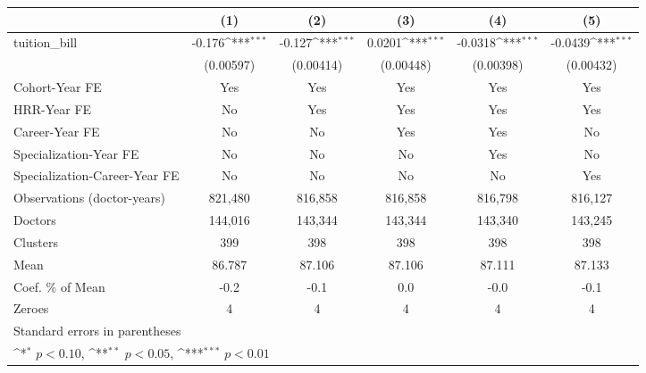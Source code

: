 {
\def\sym#1{\ifmmode^{#1}\else\(^{#1}\)\fi}
\begin{tabular}{l*{5}{c}}
\hline\hline
                    &\multicolumn{1}{c}{(1)}         &\multicolumn{1}{c}{(2)}         &\multicolumn{1}{c}{(3)}         &\multicolumn{1}{c}{(4)}         &\multicolumn{1}{c}{(5)}         \\
\hline
tuition\_bill        &      -0.176\sym{***}&      -0.127\sym{***}&      0.0201\sym{***}&     -0.0318\sym{***}&     -0.0439\sym{***}\\
                    &   (0.00597)         &   (0.00414)         &   (0.00448)         &   (0.00398)         &   (0.00432)         \\
[1em]
Cohort-Year FE      &         Yes         &         Yes         &         Yes         &         Yes         &         Yes         \\
[1em]
HRR-Year FE         &          No         &         Yes         &         Yes         &         Yes         &         Yes         \\
[1em]
Career-Year FE      &          No         &          No         &         Yes         &         Yes         &          No         \\
[1em]
Specialization-Year FE&          No         &          No         &          No         &         Yes         &          No         \\
[1em]
Specialization-Career-Year FE&          No         &          No         &          No         &          No         &         Yes         \\
\hline
Observations (doctor-years)&     821,480         &     816,858         &     816,858         &     816,798         &     816,127         \\
Doctors             &     144,016         &     143,344         &     143,344         &     143,340         &     143,245         \\
Clusters            &         399         &         398         &         398         &         398         &         398         \\
Mean                &      86.787         &      87.106         &      87.106         &      87.111         &      87.133         \\
Coef. \% of Mean    &        -0.2         &        -0.1         &         0.0         &        -0.0         &        -0.1         \\
Zeroes              &           4         &           4         &           4         &           4         &           4         \\
\hline\hline
\multicolumn{6}{l}{\footnotesize Standard errors in parentheses}\\
\multicolumn{6}{l}{\footnotesize \sym{*} \(p<0.10\), \sym{**} \(p<0.05\), \sym{***} \(p<0.01\)}\\
\end{tabular}
}
